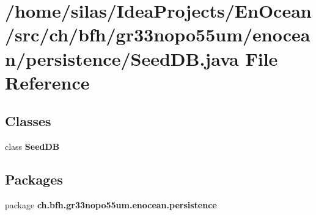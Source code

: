 \section{/home/silas/\+Idea\+Projects/\+En\+Ocean/src/ch/bfh/gr33nopo55um/enocean/persistence/\+Seed\+DB.java File Reference}
\label{SeedDB_8java}
\subsection*{Classes}
\begin{DoxyCompactItemize}
\item 
class {\bf Seed\+DB}
\end{DoxyCompactItemize}
\subsection*{Packages}
\begin{DoxyCompactItemize}
\item 
package {\bf ch.\+bfh.\+gr33nopo55um.\+enocean.\+persistence}
\end{DoxyCompactItemize}
